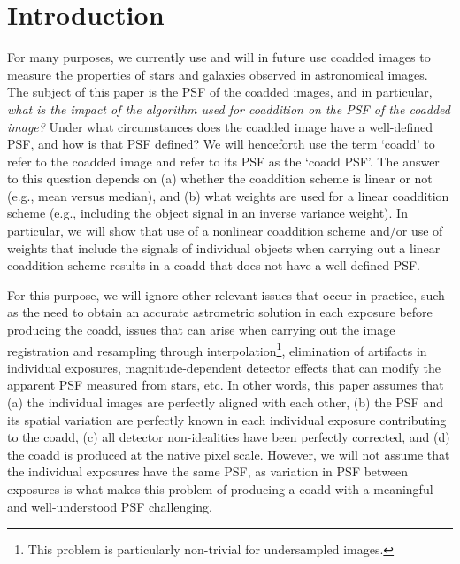 \documentclass{aastex63}
\begin{document}
\section{Introduction}\label{sec:intro}

For many purposes, we currently use and will in future use coadded images to measure the properties of stars and galaxies observed in astronomical images.  The subject of this paper is the PSF of the coadded images, and in particular, {\em what is the impact of the algorithm used for coaddition on the PSF of the coadded image?} Under what circumstances does the coadded image have a well-defined PSF, and how is that PSF defined?  We will henceforth use the term `coadd' to refer to the coadded image and refer to its PSF as the `coadd PSF'.  The answer to this question depends on (a) whether the coaddition scheme is linear or not (e.g., mean versus median), and (b) what weights are used for a linear coaddition scheme (e.g., including the object signal in an inverse variance weight). In particular, we will show that use of a nonlinear coaddition scheme and/or use of weights that include the signals of individual objects when carrying out a linear coaddition scheme results in a coadd that does not have a well-defined PSF.

For this purpose, we will ignore other relevant issues that occur in practice, such as the need to obtain an accurate astrometric solution in each exposure before producing the coadd, issues that can arise when carrying out the image registration and resampling through interpolation\footnote{This problem is particularly non-trivial for undersampled images.}, elimination of artifacts in individual exposures, magnitude-dependent detector effects that can modify the apparent PSF measured from stars, etc.  In other words, this paper assumes that (a) the individual images are perfectly aligned with each other, (b) the PSF and its spatial variation are perfectly known in each individual exposure contributing to the coadd, (c) all detector non-idealities have been perfectly corrected, and (d) the coadd is produced at the native pixel scale. 
However, we will not assume that the individual exposures have the same PSF, as variation in PSF between exposures is what makes this problem of producing a coadd with a meaningful and well-understood PSF challenging. 
\end{document}
